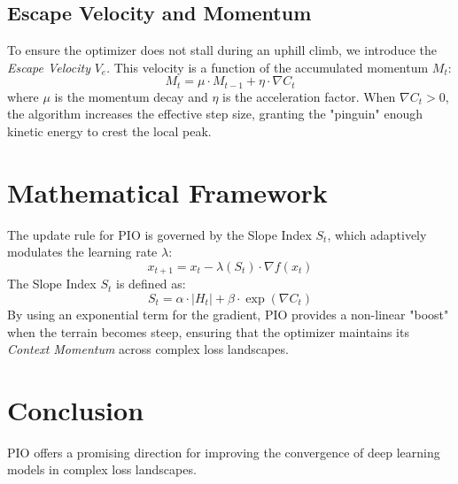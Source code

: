 \documentclass[conference]{IEEEtran}
\begin{document}
\subsection{Escape Velocity and Momentum}
To ensure the optimizer does not stall during an uphill climb, we introduce the \textit{Escape Velocity} $V_e$. This velocity is a function of the accumulated momentum $M_t$:
\begin{equation}
M_t = \mu \cdot M_{t-1} + \eta \cdot \nabla C_t
\end{equation}
where $\mu$ is the momentum decay and $\eta$ is the acceleration factor. When $\nabla C_t > 0$, the algorithm increases the effective step size, granting the "pinguin" enough kinetic energy to crest the local peak.

\section{Mathematical Framework}
The update rule for PIO is governed by the Slope Index $S_t$, which adaptively modulates the learning rate $\lambda$:
\begin{equation}
x_{t+1} = x_t - \lambda(S_t) \cdot \nabla f(x_t)
\end{equation}
The Slope Index $S_t$ is defined as:
\begin{equation}
S_t = \alpha \cdot |H_t| + \beta \cdot \exp(\nabla C_t)
\end{equation}
By using an exponential term for the gradient, PIO provides a non-linear "boost" when the terrain becomes steep, ensuring that the optimizer maintains its \textit{Context Momentum} across complex loss landscapes.

\section{Conclusion}
PIO offers a promising direction for improving the convergence of deep learning models in complex loss landscapes.



\end{document}
